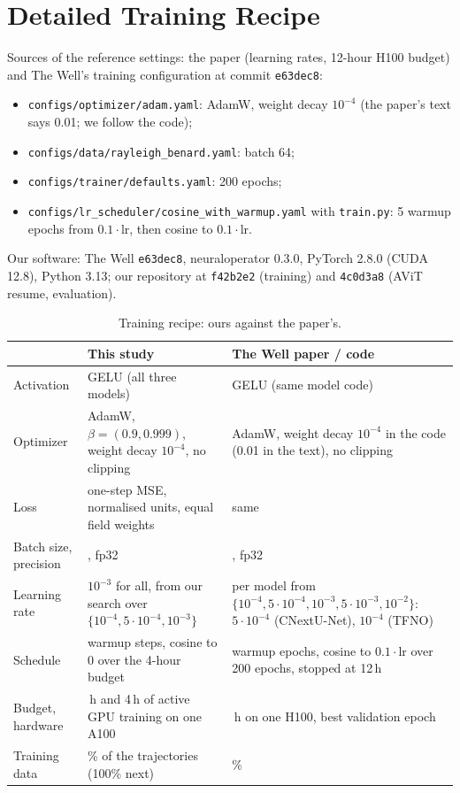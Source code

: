 \documentclass[11pt]{article}
\begin{document}
\section{Detailed Training Recipe}
\label{app:recipe}
Sources of the reference settings: the paper (learning rates, 12-hour H100 budget) and The Well's training
configuration at commit \texttt{e63dec8}:
\begin{itemize}
    \item \texttt{configs/optimizer/adam.yaml}: AdamW, weight decay $10^{-4}$ (the paper's text says 0.01; we
    follow the code);
    \item \texttt{configs/data/rayleigh\_benard.yaml}: batch 64;
    \item \texttt{configs/trainer/defaults.yaml}: 200 epochs;
    \item \texttt{configs/lr\_scheduler/cosine\_with\_warmup.yaml} with \texttt{train.py}: 5 warmup epochs
    from $0.1\cdot$lr, then cosine to $0.1\cdot$lr.
\end{itemize}
Our software: The Well \texttt{e63dec8}, neuraloperator 0.3.0, PyTorch 2.8.0 (CUDA 12.8), Python 3.13; our
repository at \texttt{f42b2e2} (training) and \texttt{4c0d3a8} (AViT resume, evaluation).

\begin{table}[!htbp]
\centering\footnotesize
\begin{tabularx}{\linewidth}{@{}>{\raggedright\arraybackslash}p{2.0cm}>{\raggedright\arraybackslash}X>{\raggedright\arraybackslash}X@{}}
\toprule
& This study & The Well paper / code \\
\midrule
Activation & GELU (all three models) & GELU (same model code) \\
Optimizer & AdamW, $\beta = (0.9, 0.999)$, weight decay $10^{-4}$, no clipping & AdamW, weight decay $10^{-4}$ in the code (0.01 in the text), no clipping \\
Loss & one-step MSE, normalised units, equal field weights & same \\
Batch size, precision & 64, fp32 & 64, fp32 \\
Learning rate & $10^{-3}$ for all, from our search over $\{10^{-4}, 5\cdot10^{-4}, 10^{-3}\}$ & per model from $\{10^{-4}, 5\cdot10^{-4}, 10^{-3}, 5\cdot10^{-3}, 10^{-2}\}$: $5\cdot10^{-4}$ (CNextU-Net), $10^{-4}$ (TFNO) \\
Schedule & 500 warmup steps, cosine to 0 over the 4-hour budget & 5 warmup epochs, cosine to $0.1\cdot$lr over 200 epochs, stopped at 12\,h \\
Budget, hardware & 1\,h and 4\,h of active GPU training on one A100 & 12\,h on one H100, best validation epoch \\
Training data & 10\% of the trajectories (100\% next) & 100\% \\
\bottomrule
\end{tabularx}
\caption{Training recipe: ours against the paper's.}
\label{tab:recipe}
\end{table}
\end{document}

